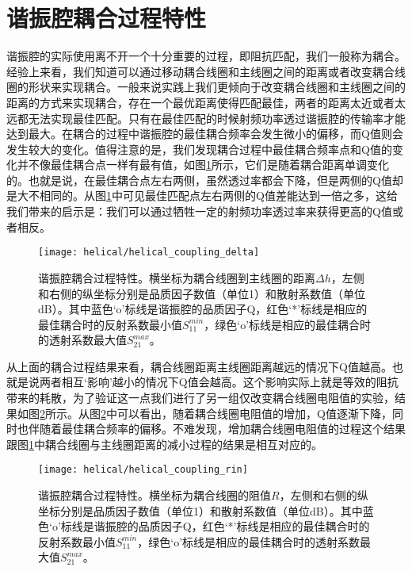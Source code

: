 \section{谐振腔耦合过程特性}
谐振腔的实际使用离不开一个十分重要的过程，即阻抗匹配，我们一般称为耦合。经验上来看，我们知道可以通过移动耦合线圈和主线圈之间的距离或者改变耦合线圈的形状来实现耦合。一般来说实践上我们更倾向于改变耦合线圈和主线圈之间的距离的方式来实现耦合，存在一个最优距离使得匹配最佳，两者的距离太近或者太远都无法实现最佳匹配。只有在最佳匹配的时候射频功率透过谐振腔的传输率才能达到最大。在耦合的过程中谐振腔的最佳耦合频率会发生微小的偏移，而Q值则会发生较大的变化。值得注意的是，我们发现耦合过程中最佳耦合频率点和Q值的变化并不像最佳耦合点一样有最有值，如图\ref{fig:helical_coupling_delta}所示，它们是随着耦合距离单调变化的。也就是说，在最佳耦合点左右两侧，虽然透过率都会下降，但是两侧的Q值却是大不相同的。从图\ref{fig:helical_coupling_delta}中可见最佳匹配点左右两侧的Q值差能达到一倍之多，这给我们带来的启示是：我们可以通过牺牲一定的射频功率透过率来获得更高的Q值或者相反。
\begin{figure}
    \centering
    \caption[谐振腔耦合过程特性]{谐振腔耦合过程特性。横坐标为耦合线圈到主线圈的距离$\Delta h$，左侧和右侧的纵坐标分别是品质因子数值（单位1）和散射系数值（单位dB）。其中蓝色‘o’标线是谐振腔的品质因子Q，红色‘*’标线是相应的最佳耦合时的反射系数最小值$S_{11}^{min}$，绿色‘o’标线是相应的最佳耦合时的透射系数最大值$S_{21}^{max}$。\label{fig:helical_coupling_delta}}
    \texttt{[image: helical/helical\_coupling\_delta]}
\end{figure}

从上面的耦合过程结果来看，耦合线圈距离主线圈距离越远的情况下Q值越高。也就是说两者相互‘影响’越小的情况下Q值会越高。这个影响实际上就是等效的阻抗带来的耗散，为了验证这一点我们进行了另一组仅改变耦合线圈电阻值的实验，结果如图\ref{fig:helical_coupling_rin}所示。从图\ref{fig:helical_coupling_rin}中可以看出，随着耦合线圈电阻值的增加，Q值逐渐下降，同时也伴随着最佳耦合频率的偏移。不难发现，增加耦合线圈电阻值的过程这个结果跟图\ref{fig:helical_coupling_delta}中耦合线圈与主线圈距离的减小过程的结果是相互对应的。
\begin{figure}
    \centering
    \caption[谐振腔耦合过程特性]{谐振腔耦合过程特性。横坐标为耦合线圈的阻值$R$，左侧和右侧的纵坐标分别是品质因子数值（单位1）和散射系数值（单位dB）。其中蓝色‘o’标线是谐振腔的品质因子Q，红色‘*’标线是相应的最佳耦合时的反射系数最小值$S_{11}^{min}$，绿色‘o’标线是相应的最佳耦合时的透射系数最大值$S_{21}^{max}$。\label{fig:helical_coupling_rin}}
    \texttt{[image: helical/helical\_coupling\_rin]}
\end{figure}


